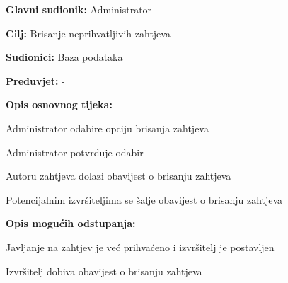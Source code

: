				
					\noindent {}
					\begin{packed_item}
						
						\item \textbf{Glavni sudionik: }Administrator
						\item  \textbf{Cilj:} Brisanje neprihvatljivih zahtjeva 
						\item  \textbf{Sudionici:} Baza podataka
						\item  \textbf{Preduvjet:} -
						\item  \textbf{Opis osnovnog tijeka:}
						
						\item[] \begin{packed_enum}
							
							\item Administrator odabire opciju brisanja zahtjeva
							\item Administrator potvrđuje odabir
							\item Autoru zahtjeva dolazi obavijest o brisanju zahtjeva
							\item Potencijalnim izvršiteljima se šalje obavijest o brisanju zahtjeva
						\end{packed_enum}
						
						\item  \textbf{Opis mogućih odstupanja:}
						
						\item[] \begin{packed_item}
							
							\item[2.a] Javljanje na zahtjev je već prihvaćeno i izvršitelj je postavljen
							\item[] \begin{packed_enum}
								
								\item Izvršitelj dobiva obavijest o brisanju zahtjeva
								
							\end{packed_enum}
							
						\end{packed_item}
					\end{packed_item}	
				
